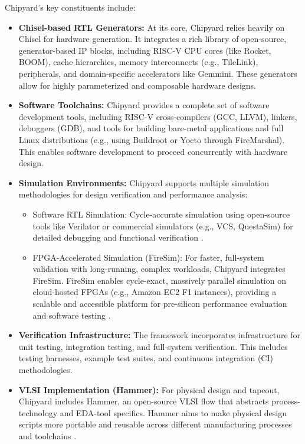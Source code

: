 Chipyard's key constituents include:
\begin{itemize}
    \item \textbf{Chisel-based RTL Generators:} At its core, Chipyard relies heavily on Chisel for hardware generation. It integrates a rich library of open-source, generator-based IP blocks, including RISC-V CPU cores (like Rocket, BOOM), cache hierarchies, memory interconnects (e.g., TileLink), peripherals, and domain-specific accelerators like Gemmini. These generators allow for highly parameterized and composable hardware designs.
    \item \textbf{Software Toolchains:} Chipyard provides a complete set of software development tools, including RISC-V cross-compilers (GCC, LLVM), linkers, debuggers (GDB), and tools for building bare-metal applications and full Linux distributions (e.g., using Buildroot or Yocto through FireMarshal). This enables software development to proceed concurrently with hardware design.
    \item \textbf{Simulation Environments:} Chipyard supports multiple simulation methodologies for design verification and performance analysis:
    \begin{itemize}
        \item Software RTL Simulation: Cycle-accurate simulation using open-source tools like Verilator or commercial simulators (e.g., VCS, QuestaSim) for detailed debugging and functional verification \cite[p.~29]{chipyard}.
        \item FPGA-Accelerated Simulation (FireSim): For faster, full-system validation with long-running, complex workloads, Chipyard integrates FireSim. FireSim enables cycle-exact, massively parallel simulation on cloud-hosted FPGAs (e.g., Amazon EC2 F1 instances), providing a scalable and accessible platform for pre-silicon performance evaluation and software testing \cite{karandikar2018firesim, chipyard}.
    \end{itemize}
    \item \textbf{Verification Infrastructure:} The framework incorporates infrastructure for unit testing, integration testing, and full-system verification. This includes testing harnesses, example test suites, and continuous integration (CI) methodologies.
    \item \textbf{VLSI Implementation (Hammer):} For physical design and tapeout, Chipyard includes Hammer, an open-source VLSI flow that abstracts process-technology and EDA-tool specifics. Hammer aims to make physical design scripts more portable and reusable across different manufacturing processes and toolchains \cite{chipyard}.
\end{itemize}

